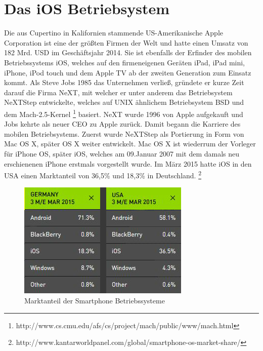\section{Das iOS Betriebsystem}
	Die aus Cupertino in Kalifornien stammende US-Amerikanische Apple Corporation
	ist eine der größten Firmen der Welt und hatte einen Umsatz von 182 Mrd.
	USD im Geschäftsjahr 2014. Sie ist ebenfalls der Erfinder des mobilen
	Betriebssystems iOS, welches auf den firmeneigenen Geräten iPad, iPad mini,
	iPhone, iPod touch und dem Apple TV ab der zweiten Generation zum Einsatz
	kommt. Als Steve Jobs 1985 das Unternehmen verließ, gründete er
	kurze Zeit darauf die Firma NeXT, mit welcher er unter anderem das
	Betriebsystem NeXTStep entwickelte, welches auf UNIX ähnlichem Betriebsystem
	BSD\cite{Tanenbaum2009} und dem	Mach-2.5-Kernel
	\footnote{http://www.cs.cmu.edu/afs/cs/project/mach/public/www/mach.html}
	basiert. NeXT wurde 1996 von Apple aufgekauft und Jobs kehrte als neuer CEO zu
	Apple zurück. Damit begann die Karriere des mobilen Betriebsystems. Zuerst
	wurde NeXTStep als Portierung in Form von Mac OS X, später OS X weiter
	entwickelt. Mac OS X ist wiederrum der Vorleger für iPhone OS, später iOS,
	welches am 09.Januar 2007 mit dem damals neu erschienenen iPhone erstmals
	vorgestellt wurde. Im März 2015 hatte iOS in den USA einen Marktanteil von
	36,5\% und 18,3\% in Deutschland.
	\footnote{http://www.kantarworldpanel.com/global/smartphone-os-market-share/}\\
	
	\begin{figure}[h]
		\centering
		\includegraphics[width=0.5\linewidth]{ios/media/marketshare_cmp_201503.jpg}
		\caption{Marktanteil der Smartphone Betriebssysteme \cite{MobileOsStat}}
		\label{fig:marcetshare}
	\end{figure}
